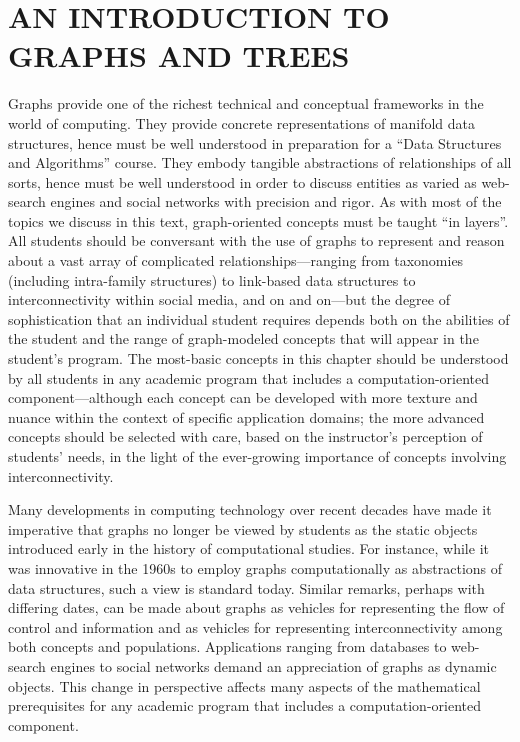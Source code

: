
\chapter{AN INTRODUCTION TO GRAPHS AND TREES}
\label{Ch:Graphs-Trees}

Graphs provide one of the richest technical and conceptual frameworks
in the world of computing.  They provide concrete representations of
manifold data structures, hence must be well understood in preparation
for a ``Data Structures and Algorithms'' course.  They embody tangible
abstractions of relationships of all sorts, hence must be well
understood in order to discuss entities as varied as web-search
engines and social networks with precision and rigor.  As with most of
the topics we discuss in this text, graph-oriented concepts must be
taught ``in layers''.  All students should be conversant with the use
of graphs to represent and reason about a vast array of complicated
relationships---ranging from taxonomies (including intra-family
structures) to link-based data structures to interconnectivity within
social media, and on and on---but the degree of sophistication that an
individual student requires depends both on the abilities of the
student and the range of graph-modeled concepts that will appear in
the student's program.  The most-basic concepts in this chapter should
be understood by all students in any academic program that includes a
computation-oriented component---although each concept can be
developed with more texture and nuance within the context of specific
application domains; the more advanced concepts should be selected
with care, based on the instructor's perception of students' needs, in
the light of the ever-growing importance of concepts involving
interconnectivity.

Many developments in computing technology over recent decades have
made it imperative that graphs no longer be viewed by students as the
static objects introduced early in the history of computational
studies.  For instance, while it was innovative in the 1960s to employ
graphs computationally as abstractions of data structures, such a view
is standard today.  Similar remarks, perhaps with differing dates, can
be made about graphs as vehicles for representing the flow of control
and information and as vehicles for representing interconnectivity
among both concepts and populations.  Applications ranging from
databases to web-search engines to social networks demand an
appreciation of graphs as dynamic objects.  This change in perspective
affects many aspects of the mathematical prerequisites for any
academic program that includes a computation-oriented component.

